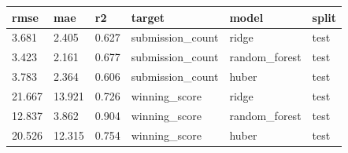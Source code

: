 \begin{tabular}{llllll}
\toprule
rmse & mae & r2 & target & model & split \\
\midrule
3.681 & 2.405 & 0.627 & submission\_count & ridge & test \\
3.423 & 2.161 & 0.677 & submission\_count & random\_forest & test \\
3.783 & 2.364 & 0.606 & submission\_count & huber & test \\
21.667 & 13.921 & 0.726 & winning\_score & ridge & test \\
12.837 & 3.862 & 0.904 & winning\_score & random\_forest & test \\
20.526 & 12.315 & 0.754 & winning\_score & huber & test \\
\bottomrule
\end{tabular}
